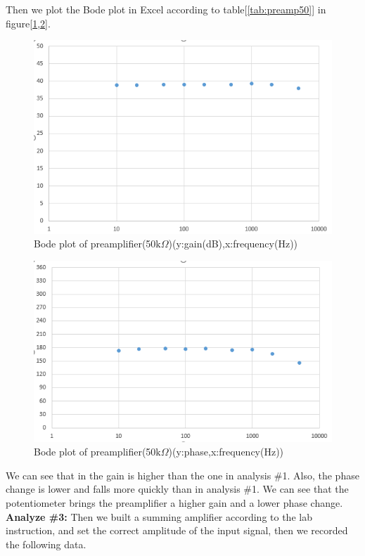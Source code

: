 \phantom{ } Then we plot the Bode plot in Excel according to table[\ref{tab:preamp50}] in figure[\ref{fig:104},\ref{fig:105}].
\begin{figure}[!htbp]
	\centering 
	\begin{framed}
		\includegraphics[width=\linewidth]{images/1_3.PNG} 
		\caption{Bode plot of preamplifier(50$ \si{\kilo\Omega} $)(y:gain(dB),x:frequency(Hz))}
		\label{fig:104} 
	\end{framed}
\end{figure} 

\begin{figure}[!htbp]
	\centering 
	\begin{framed}
		\includegraphics[width=\linewidth]{images/1_4.PNG} 
		\caption{Bode plot of preamplifier(50$ \si{\kilo\Omega} $)(y:phase,x:frequency(Hz))}
		\label{fig:105} 
	\end{framed}
\end{figure}

\phantom{ } We can see that in the gain is higher than the one in analysis \#1. Also, the phase change is lower and falls more quickly than in analysis \#1. We can see that the potentiometer brings the preamplifier a higher gain and a lower phase change.\\
\hfill \newline
\textbf{Analyze \#3:} \newline
\phantom{ } Then we built a summing amplifier according to the lab instruction, and set the correct amplitude of the input signal, then we recorded the following data.

